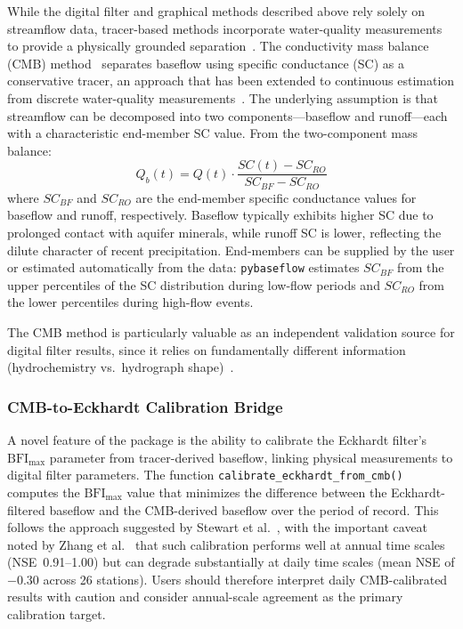 \documentclass[hydrology,article,submit,pdftex,moreauthors]{Definitions/mdpi}
\begin{document}
While the digital filter and graphical methods described above rely solely on streamflow data, tracer-based methods incorporate water-quality measurements to provide a physically grounded separation~\cite{Klaus2013}. The conductivity mass balance (CMB) method~\cite{Stewart2007} separates baseflow using specific conductance (SC) as a conservative tracer, an approach that has been extended to continuous estimation from discrete water-quality measurements~\cite{Miller2015}. The underlying assumption is that streamflow can be decomposed into two components---baseflow and runoff---each with a characteristic end-member SC value. From the two-component mass balance:
\begin{equation}
\label{eq:cmb}
Q_b(t) = Q(t) \cdot \frac{SC(t) - SC_{RO}}{SC_{BF} - SC_{RO}}
\end{equation}
where $SC_{BF}$ and $SC_{RO}$ are the end-member specific conductance values for baseflow and runoff, respectively. Baseflow typically exhibits higher SC due to prolonged contact with aquifer minerals, while runoff SC is lower, reflecting the dilute character of recent precipitation. End-members can be supplied by the user or estimated automatically from the data: \texttt{pybaseflow} estimates $SC_{BF}$ from the upper percentiles of the SC distribution during low-flow periods and $SC_{RO}$ from the lower percentiles during high-flow events.

The CMB method is particularly valuable as an independent validation source for digital filter results, since it relies on fundamentally different information (hydrochemistry vs.\ hydrograph shape)~\cite{Lott2016}.

\subsubsection{CMB-to-Eckhardt Calibration Bridge}

A novel feature of the package is the ability to calibrate the Eckhardt filter's $\mathrm{BFI_{max}}$ parameter from tracer-derived baseflow, linking physical measurements to digital filter parameters. The function \texttt{calibrate\_eckhardt\_from\_cmb()} computes the $\mathrm{BFI_{max}}$ value that minimizes the difference between the Eckhardt-filtered baseflow and the CMB-derived baseflow over the period of record. This follows the approach suggested by Stewart et al.~\cite{Stewart2007}, with the important caveat noted by Zhang et al.~\cite{Zhang2021} that such calibration performs well at annual time scales (NSE~0.91--1.00) but can degrade substantially at daily time scales (mean NSE of $-0.30$ across 26 stations). Users should therefore interpret daily CMB-calibrated results with caution and consider annual-scale agreement as the primary calibration target.
\end{document}
